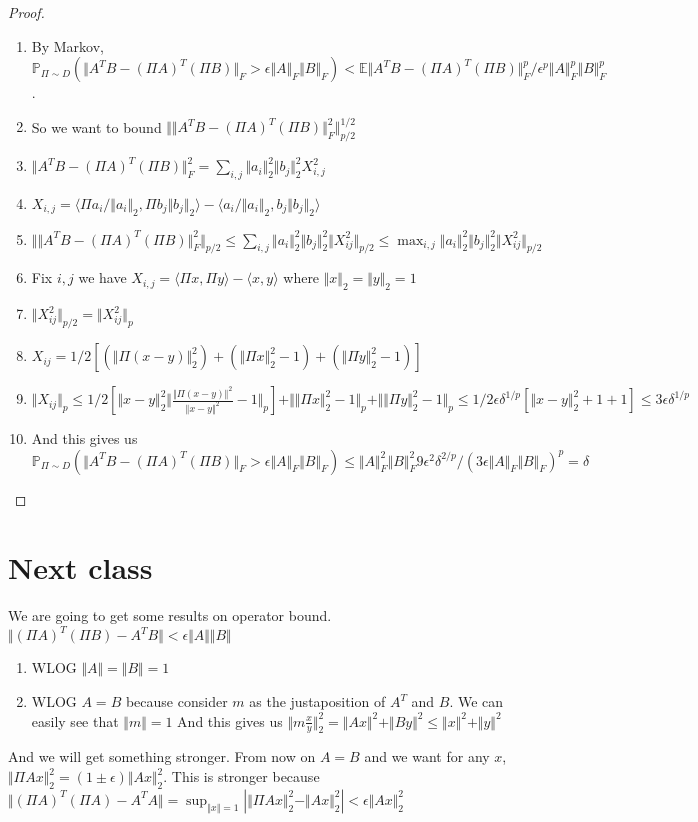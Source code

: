 \documentclass[11pt]{article}
\begin{document}
\begin{proof}
\begin{enumerate}
\item By Markov,
$\mathbb{P}_{\Pi\sim D}(\Vert A^TB-(\Pi A)^T(\Pi B)\Vert_F>\epsilon\Vert A\Vert_F\Vert B\Vert_F)<\mathbb{E}\Vert A^TB-(\Pi A)^T(\Pi B)\Vert_F^p/\epsilon^p\Vert A\Vert_F^p\Vert B\Vert_F^p$.
\item  So we want to bound $\Vert\Vert A^TB-(\Pi A)^T(\Pi B)\Vert_F^2\Vert_{p/2}^{1/2}$
\item $\Vert  A^TB-(\Pi A)^T(\Pi B)\Vert_F^2=\sum_{i,j}\Vert a_i\Vert_2^2\Vert b_j\Vert_2^2X_{i,j}^2$
\item $X_{i,j} = \langle \Pi a_i/\Vert a_i\Vert_2, \Pi b_j\Vert b_j\Vert_2\rangle - \langle a_i/\Vert a_i\Vert_2,b_j\Vert b_j\Vert_2\rangle$
\item $\Vert\Vert A^TB-(\Pi A)^T(\Pi B)\Vert_F^2\Vert_{p/2}\leq \sum_{i,j}\Vert a_i\Vert_2^2\Vert b_j\Vert_2^2\Vert X_{ij}^2\Vert_{p/2}\leq \max_{i,j}\Vert a_i\Vert_2^2\Vert b_j\Vert_2^2\Vert X_{ij}^2\Vert_{p/2}$
\item Fix $i, j$ we have $X_{i,j} = \langle \Pi x, \Pi y\rangle - \langle x,y\rangle$ where $\Vert x\Vert_2=\Vert y\Vert_2 = 1$
\item $\Vert X_{ij}^2\Vert_{p/2} = \Vert X_{ij}^2\Vert_p$
\item $X_{ij} = 1/2[(\Vert\Pi(x-y)\Vert_2^2) + (\Vert\Pi x\Vert_2^2-1) + (\Vert\Pi y\Vert_2^2-1)]$
\item $\Vert X_{ij}\Vert_p\leq 1/2[\Vert x-y\Vert_2^2\Vert\frac{\Vert\Pi(x-y)\Vert^2}{\Vert x-y\Vert^2}-1\Vert_p] + \Vert\Vert\Pi x\Vert_2^2-1\Vert_p + \Vert\Vert\Pi y\Vert_2^2-1\Vert_p\leq 1/2\epsilon\delta^{1/p}[\Vert x-y\Vert_2^2 + 1 + 1]\leq 3\epsilon\delta^{1/p}$
\item And this gives us $\mathbb{P}_{\Pi\sim D}(\Vert A^TB-(\Pi A)^T(\Pi B)\Vert_F>\epsilon\Vert A\Vert_F\Vert B\Vert_F)\leq \Vert A\Vert_F^2\Vert B\Vert_F^2 9 \epsilon^2\delta^{2/p}/(3\epsilon\Vert A\Vert_F\Vert B\Vert_F)^p=\delta$
\end{enumerate}

\end{proof}
\section{Next class}
We are going to get some results on operator bound.
$\Vert (\Pi A)^T(\Pi B) - A^TB\Vert < \epsilon\Vert A\Vert\Vert B\Vert$
\begin{enumerate}
\item WLOG $\Vert A\Vert = \Vert B\Vert = 1$
\item WLOG $A=B$ because consider $m$ as the justaposition of $A^T$ and $B$. We can easily see that $\Vert m\Vert = 1$ And this gives us $\Vert m\frac{x}{y}\Vert_2^2 =\Vert Ax\Vert^2 + \Vert By\Vert^2\leq \Vert x\Vert^2 + \Vert y\Vert^2 $
\end{enumerate} 
And we will get something stronger.
From now on $A=B$ and we want for any $x$, $\Vert \Pi Ax\Vert_2^2 = (1\pm\epsilon)\Vert Ax\Vert_2^2$. This is stronger because $\Vert (\Pi A)^T(\Pi A) - A^TA\Vert = \sup_{\Vert x\Vert = 1}|\Vert\Pi Ax\Vert_2^2 - \Vert Ax\Vert_2^2|<\epsilon\Vert Ax\Vert_2^2$
\end{document}
